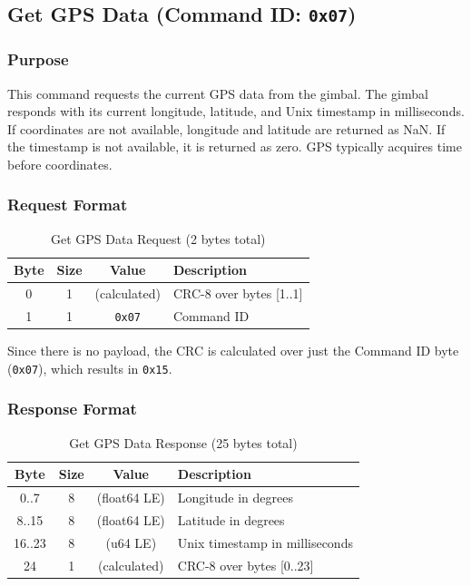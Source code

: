 \documentclass[12pt, titlepage]{article}
\begin{document}
\subsection{Get GPS Data (Command ID: \texttt{0x07})}

\subsubsection{Purpose}
This command requests the current GPS data from the gimbal. The gimbal responds
with its current longitude, latitude, and Unix timestamp in milliseconds. If
coordinates are not available, longitude and latitude are returned as NaN. If
the timestamp is not available, it is returned as zero. GPS typically acquires
time before coordinates.

\subsubsection{Request Format}

\begin{table}[H]
  \centering
  \begin{tabular}{cccl}
    \toprule
    \textbf{Byte} & \textbf{Size} & \textbf{Value} & \textbf{Description}    \\
    \midrule
    0             & 1             & (calculated)   & CRC-8 over bytes [1..1] \\
    1             & 1             & \texttt{0x07}  & Command ID              \\
    \bottomrule
  \end{tabular}
  \caption{Get GPS Data Request (2 bytes total)}
\end{table}

Since there is no payload, the CRC is calculated over just the Command ID byte
(\texttt{0x07}), which results in \texttt{0x15}.

\subsubsection{Response Format}

\begin{table}[H]
  \centering
  \begin{tabular}{cccl}
    \toprule
    \textbf{Byte} & \textbf{Size} & \textbf{Value} & \textbf{Description}           \\
    \midrule
    0..7          & 8             & (float64 LE)   & Longitude in degrees           \\
    8..15         & 8             & (float64 LE)   & Latitude in degrees            \\
    16..23        & 8             & (u64 LE)       & Unix timestamp in milliseconds \\
    24            & 1             & (calculated)   & CRC-8 over bytes [0..23]       \\
    \bottomrule
  \end{tabular}
  \caption{Get GPS Data Response (25 bytes total)}
\end{table}
\end{document}
